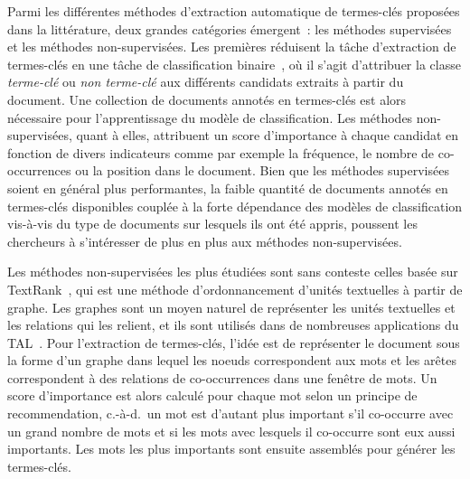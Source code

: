   Parmi les différentes méthodes d'extraction automatique de termes-clés proposées dans la littérature, deux grandes catégories émergent~: les méthodes supervisées et les méthodes non-supervisées.
  Les premières réduisent la tâche d'extraction de termes-clés en une tâche de classification binaire~\cite{witten1999kea}, où il s'agit d'attribuer la classe \og{}\textit{terme-clé}\fg{} ou \og{}\textit{non terme-clé}\fg{} aux différents candidats extraits à partir du document.
  Une collection de documents annotés en termes-clés est alors nécessaire pour l'apprentissage du modèle de classification.
  Les méthodes non-supervisées, quant à elles, attribuent un score d'importance à chaque candidat en fonction de divers indicateurs comme par exemple la fréquence, le nombre de co-occurrences ou la position dans le document.
  Bien que les méthodes supervisées soient en général plus performantes, la faible quantité de documents annotés en termes-clés disponibles couplée à la forte dépendance des modèles de classification vis-à-vis du type de documents sur lesquels ils ont été appris, poussent les chercheurs à s'intéresser de plus en plus aux méthodes non-supervisées.

  Les méthodes non-supervisées les plus étudiées sont sans conteste celles basée sur TextRank~\cite{mihalcea2004textrank}, qui est une méthode d'ordonnancement d'unités textuelles à partir de graphe.
  Les graphes sont un moyen naturel de représenter les unités textuelles et les relations qui les relient, et ils sont utilisés dans de nombreuses applications du TAL~\cite{textgraphs2013}.
  Pour l'extraction de termes-clés, l'idée est de représenter le document sous la forme d'un graphe dans lequel les noeuds correspondent aux mots et les arêtes correspondent à des relations de co-occurrences dans une fenêtre de mots.
  Un score d'importance est alors calculé pour chaque mot selon un principe de recommendation, c.-à-d.~un mot est d'autant plus important s'il co-occurre avec un grand nombre de mots et si les mots avec lesquels il co-occurre sont eux aussi importants.
  Les mots les plus importants sont ensuite assemblés pour générer les termes-clés.


